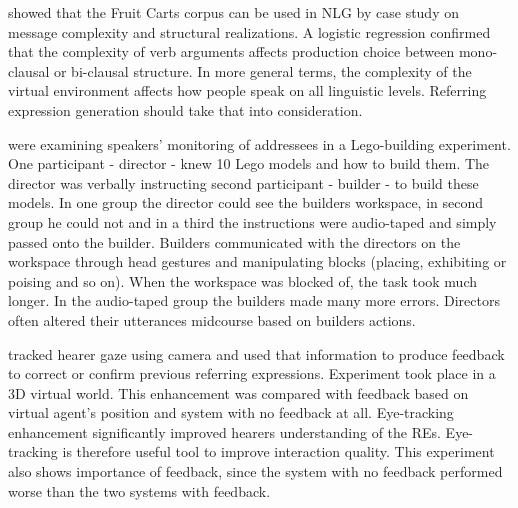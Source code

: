 \citet{gallo2008production} showed that the Fruit Carts corpus can be used in NLG by case study on message complexity and structural realizations. A logistic regression confirmed that the complexity of verb arguments affects production choice between mono-clausal or bi-clausal structure. In more general terms, the complexity of the virtual environment affects how people speak on all linguistic levels. Referring expression generation should take that into consideration.

\citet{clark2004speaking} were examining speakers' monitoring of addressees in a Lego-building experiment. One participant - director - knew 10 Lego models and how to build them. The director was verbally instructing second participant - builder - to build these models. In one group the director could see the builders workspace, in second group he could not and in a third the instructions were audio-taped and simply passed onto the builder. Builders communicated with the directors on the workspace through head gestures and manipulating blocks (placing, exhibiting or poising and so on). When the workspace was blocked of, the task took much longer. In the audio-taped group the builders made many more errors. Directors often altered their utterances midcourse based on builders actions.

\citet{koller2012enhancing} tracked hearer gaze using camera and used that information to produce feedback to correct or confirm previous referring expressions. Experiment took place in a 3D virtual world. This enhancement was compared with feedback based on virtual agent's position and system with no feedback at all. Eye-tracking enhancement significantly improved hearers understanding of the REs. Eye-tracking is therefore useful tool to improve interaction quality. This experiment also shows importance of feedback, since the system with no feedback performed worse than the two systems with feedback.
